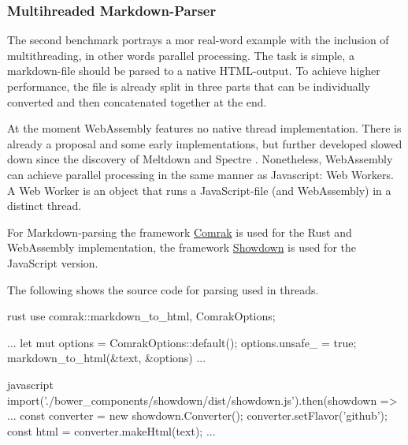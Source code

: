 \subsubsection{Multihreaded Markdown-Parser}
The second benchmark portrays a mor real-word example with the inclusion of multithreading, in other words parallel processing. The task is simple, a \gls{markdown}-file should be parsed to a native HTML-output. To achieve higher performance, the file is already split in three parts that can be individually converted and then concatenated together at the end.

At the moment WebAssembly features no native thread implementation. There is already a proposal and some early implementations, but further developed slowed down since the discovery of Meltdown and Spectre \cite[cf.][]{wasm:threads}. Nonetheless, WebAssembly can achieve parallel processing in the same manner as Javascript: Web Workers. A Web Worker is an object that runs a JavaScript-file (and WebAssembly) in a distinct thread. 

For Markdown-parsing the framework \href{https://github.com/kivikakk/comrak}{Comrak} is used for the Rust and WebAssembly implementation, the framework \href{https://github.com/showdownjs/showdown}{Showdown} is used for the JavaScript version.

The following shows the source code for parsing used in threads.

\begin{listing}
\noindent
\begin{minipage}[t]{0.45\textwidth}
\begin{code}[]{rust}
use comrak::{markdown_to_html, ComrakOptions};

...
let mut options = ComrakOptions::default();
options.unsafe_ = true;
markdown_to_html(&text, &options)
...
\end{code}
\end{minipage}
\hspace{1cm}
\begin{minipage}[t]{0.45\textwidth}
\begin{code}[]{javascript}
import('./bower_components/showdown/dist/showdown.js').then(showdown => {
    ...
    const converter = new showdown.Converter();
    converter.setFlavor('github');
    const html = converter.makeHtml(text);
    ...
}
\end{code}
\end{minipage}
\caption{Markdown-Parser source code - Rust/Wasm - JS}
\label{lst:wasm-code}
\end{listing}

